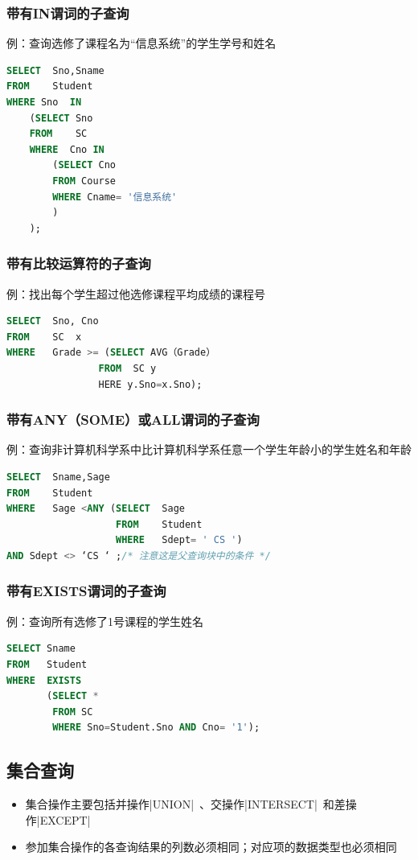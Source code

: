 \subsubsection{带有IN谓词的子查询}
例：查询选修了课程名为“信息系统”的学生学号和姓名
\begin{lstlisting}[language=sql]
SELECT  Sno,Sname                 
FROM    Student                          
WHERE Sno  IN
	(SELECT Sno                     
	FROM    SC                      
	WHERE  Cno IN
		(SELECT Cno            
		FROM Course          
		WHERE Cname= '信息系统'
		)
	);
\end{lstlisting}

\subsubsection{带有比较运算符的子查询}
例：找出每个学生超过他选修课程平均成绩的课程号
\begin{lstlisting}[language=sql]
SELECT  Sno, Cno
FROM    SC  x
WHERE   Grade >= (SELECT AVG（Grade） 
		        FROM  SC y
		        HERE y.Sno=x.Sno);
\end{lstlisting}

\subsubsection{带有ANY（SOME）或ALL谓词的子查询}
例：查询非计算机科学系中比计算机科学系任意一个学生年龄小的学生姓名和年龄
\begin{lstlisting}[language=sql]
SELECT  Sname,Sage
FROM    Student
WHERE   Sage <ANY (SELECT  Sage
                   FROM    Student
                   WHERE   Sdept= ' CS ')
AND Sdept <> ‘CS ‘ ;/* 注意这是父查询块中的条件 */
\end{lstlisting}

\subsubsection{带有EXISTS谓词的子查询}
例：查询所有选修了1号课程的学生姓名
\begin{lstlisting}[language=sql]
SELECT Sname
FROM   Student
WHERE  EXISTS
       (SELECT *
        FROM SC
        WHERE Sno=Student.Sno AND Cno= '1');
\end{lstlisting}

\subsection{集合查询}
\begin{itemize}
    \item 集合操作主要包括并操作\sverb|UNION|\ 、交操作\sverb|INTERSECT|\ 和差操作\sverb|EXCEPT|\ 
    \item 参加集合操作的各查询结果的列数必须相同；对应项的数据类型也必须相同
\end{itemize}

